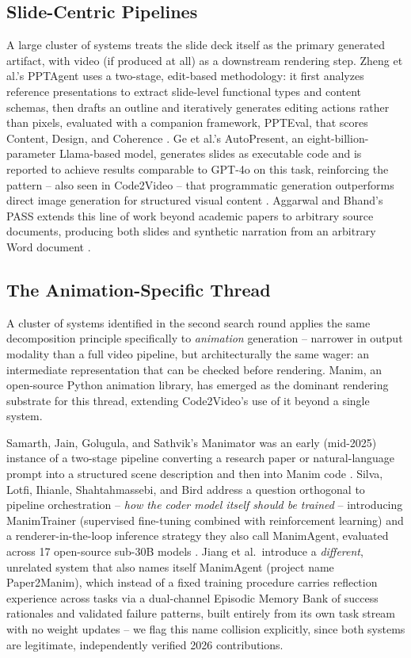 \documentclass[journal]{IEEEtran}
\begin{document}
\subsection{Slide-Centric Pipelines}

A large cluster of systems treats the slide deck itself as the primary generated artifact, with video (if produced at all) as a downstream rendering step. Zheng et al.'s PPTAgent uses a two-stage, edit-based methodology: it first analyzes reference presentations to extract slide-level functional types and content schemas, then drafts an outline and iteratively generates editing actions rather than pixels, evaluated with a companion framework, PPTEval, that scores Content, Design, and Coherence \cite{zheng2025pptagent}. Ge et al.'s AutoPresent, an eight-billion-parameter Llama-based model, generates slides as executable code and is reported to achieve results comparable to GPT-4o on this task, reinforcing the pattern -- also seen in Code2Video -- that programmatic generation outperforms direct image generation for structured visual content \cite{autopresent2025}. Aggarwal and Bhand's PASS extends this line of work beyond academic papers to arbitrary source documents, producing both slides and synthetic narration from an arbitrary Word document \cite{aggarwal2025pass}.

\subsection{The Animation-Specific Thread}
\label{sec:animation-thread}

A cluster of systems identified in the second search round applies the same decomposition principle specifically to \emph{animation} generation -- narrower in output modality than a full video pipeline, but architecturally the same wager: an intermediate representation that can be checked before rendering. Manim, an open-source Python animation library, has emerged as the dominant rendering substrate for this thread, extending Code2Video's use of it beyond a single system.

Samarth, Jain, Golugula, and Sathvik's Manimator was an early (mid-2025) instance of a two-stage pipeline converting a research paper or natural-language prompt into a structured scene description and then into Manim code \cite{samarth2025manimator}. Silva, Lotfi, Ihianle, Shahtahmassebi, and Bird address a question orthogonal to pipeline orchestration -- \emph{how the coder model itself should be trained} -- introducing ManimTrainer (supervised fine-tuning combined with reinforcement learning) and a renderer-in-the-loop inference strategy they also call ManimAgent, evaluated across 17 open-source sub-30B models \cite{silva2026manimtrainer}. Jiang et al.\ introduce a \emph{different}, unrelated system that also names itself ManimAgent (project name Paper2Manim), which instead of a fixed training procedure carries reflection experience across tasks via a dual-channel Episodic Memory Bank of success rationales and validated failure patterns, built entirely from its own task stream with no weight updates \cite{jiang2026manimagent} -- we flag this name collision explicitly, since both systems are legitimate, independently verified 2026 contributions.
\end{document}

